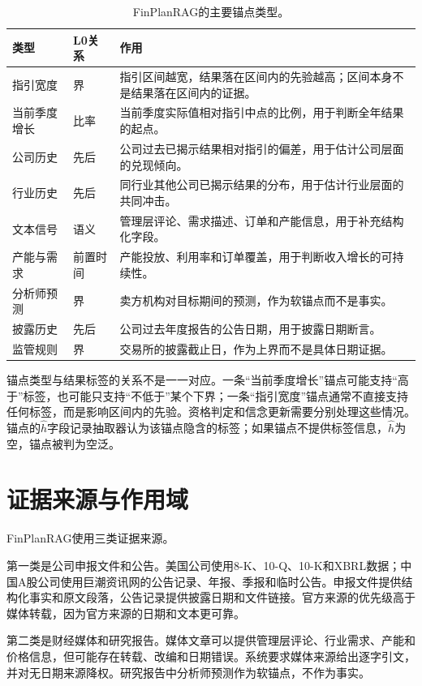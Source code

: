 \begin{table}[H]
\centering
{}
\caption{FinPlanRAG的主要锚点类型。}
\label{tab:anchortypes}
\begin{tabular}{p{2.6cm}p{2.4cm}p{7.2cm}}
\toprule
类型 & L0关系 & 作用 \\
\midrule
指引宽度 & 界 & 指引区间越宽，结果落在区间内的先验越高；区间本身不是结果落在区间内的证据。\\
当前季度增长 & 比率 & 当前季度实际值相对指引中点的比例，用于判断全年结果的起点。\\
公司历史 & 先后 & 公司过去已揭示结果相对指引的偏差，用于估计公司层面的兑现倾向。\\
行业历史 & 先后 & 同行业其他公司已揭示结果的分布，用于估计行业层面的共同冲击。\\
文本信号 & 语义 & 管理层评论、需求描述、订单和产能信息，用于补充结构化字段。\\
产能与需求 & 前置时间 & 产能投放、利用率和订单覆盖，用于判断收入增长的可持续性。\\
分析师预测 & 界 & 卖方机构对目标期间的预测，作为软锚点而不是事实。\\
披露历史 & 先后 & 公司过去年度报告的公告日期，用于披露日期断言。\\
监管规则 & 界 & 交易所的披露截止日，作为上界而不是具体日期证据。\\
\bottomrule
\end{tabular}
\end{table}

锚点类型与结果标签的关系不是一一对应。一条“当前季度增长”锚点可能支持“高于”标签，也可能只支持“不低于”某个下界；一条“指引宽度”锚点通常不直接支持任何标签，而是影响区间内的先验。资格判定和信念更新需要分别处理这些情况。锚点的$\hat h$字段记录抽取器认为该锚点隐含的标签；如果锚点不提供标签信息，$\hat h$为空，锚点被判为空泛。

\section{证据来源与作用域}

FinPlanRAG使用三类证据来源。

第一类是公司申报文件和公告。美国公司使用8-K、10-Q、10-K和XBRL数据；中国A股公司使用巨潮资讯网的公告记录、年报、季报和临时公告。申报文件提供结构化事实和原文段落，公告记录提供披露日期和文件链接。官方来源的优先级高于媒体转载，因为官方来源的日期和文本更可靠。

第二类是财经媒体和研究报告。媒体文章可以提供管理层评论、行业需求、产能和价格信息，但可能存在转载、改编和日期错误。系统要求媒体来源给出逐字引文，并对无日期来源降权。研究报告中分析师预测作为软锚点，不作为事实。

